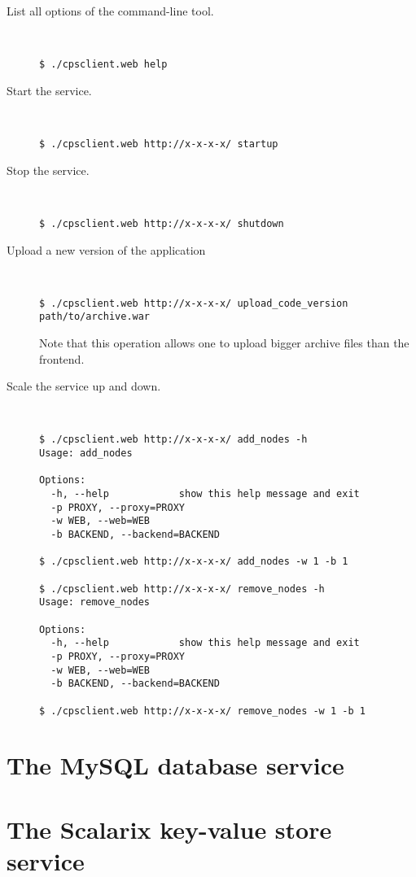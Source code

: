 \documentclass[10pt]{article}
\begin{document}
\begin{description}
\item[List all options of the command-line tool.]~
\begin{verbatim}
$ ./cpsclient.web help
\end{verbatim}

\item[Start the service.]~
\begin{verbatim}
$ ./cpsclient.web http://x-x-x-x/ startup
\end{verbatim}

\item[Stop the service.]~
\begin{verbatim}
$ ./cpsclient.web http://x-x-x-x/ shutdown
\end{verbatim}

\item[Upload a new version of the application]~
\begin{verbatim}
$ ./cpsclient.web http://x-x-x-x/ upload_code_version path/to/archive.war
\end{verbatim}
Note that this operation allows one to upload bigger archive files than the frontend.

\item[Scale the service up and down.]~
\begin{verbatim}
$ ./cpsclient.web http://x-x-x-x/ add_nodes -h
Usage: add_nodes

Options:
  -h, --help            show this help message and exit
  -p PROXY, --proxy=PROXY
  -w WEB, --web=WEB     
  -b BACKEND, --backend=BACKEND

$ ./cpsclient.web http://x-x-x-x/ add_nodes -w 1 -b 1

$ ./cpsclient.web http://x-x-x-x/ remove_nodes -h
Usage: remove_nodes

Options:
  -h, --help            show this help message and exit
  -p PROXY, --proxy=PROXY
  -w WEB, --web=WEB     
  -b BACKEND, --backend=BACKEND

$ ./cpsclient.web http://x-x-x-x/ remove_nodes -w 1 -b 1
\end{verbatim}
\end{description}


\section{The MySQL database service}

\section{The Scalarix key-value store service}
\end{document}
